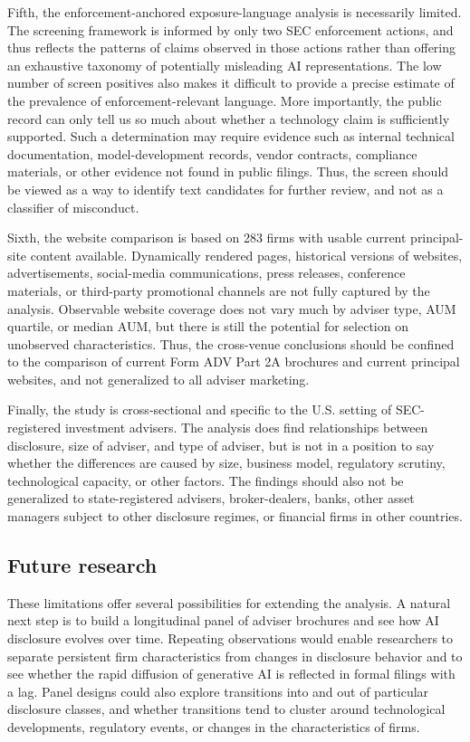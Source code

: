 \documentclass[utf8]{FrontiersinHarvard}
\begin{document}
Fifth, the enforcement-anchored exposure-language analysis is necessarily limited. The screening framework is informed by only two SEC enforcement actions, and thus reflects the patterns of claims observed in those actions rather than offering an exhaustive taxonomy of potentially misleading AI representations. The low number of screen positives also makes it difficult to provide a precise estimate of the prevalence of enforcement-relevant language. More importantly, the public record can only tell us so much about whether a technology claim is sufficiently supported. Such a determination may require evidence such as internal technical documentation, model-development records, vendor contracts, compliance materials, or other evidence not found in public filings. Thus, the screen should be viewed as a way to identify text candidates for further review, and not as a classifier of misconduct.

Sixth, the website comparison is based on 283 firms with usable current principal-site content available. Dynamically rendered pages, historical versions of websites, advertisements, social-media communications, press releases, conference materials, or third-party promotional channels are not fully captured by the analysis. Observable website coverage does not vary much by adviser type, AUM quartile, or median AUM, but there is still the potential for selection on unobserved characteristics. Thus, the cross-venue conclusions should be confined to the comparison of current Form ADV Part 2A brochures and current principal websites, and not generalized to all adviser marketing.

Finally, the study is cross-sectional and specific to the U.S. setting of SEC-registered investment advisers. The analysis does find relationships between disclosure, size of adviser, and type of adviser, but is not in a position to say whether the differences are caused by size, business model, regulatory scrutiny, technological capacity, or other factors. The findings should also not be generalized to state-registered advisers, broker-dealers, banks, other asset managers subject to other disclosure regimes, or financial firms in other countries.

\subsection{Future research}

These limitations offer several possibilities for extending the analysis. A natural next step is to build a longitudinal panel of adviser brochures and see how AI disclosure evolves over time. Repeating observations would enable researchers to separate persistent firm characteristics from changes in disclosure behavior and to see whether the rapid diffusion of generative AI is reflected in formal filings with a lag. Panel designs could also explore transitions into and out of particular disclosure classes, and whether transitions tend to cluster around technological developments, regulatory events, or changes in the characteristics of firms.
\end{document}
